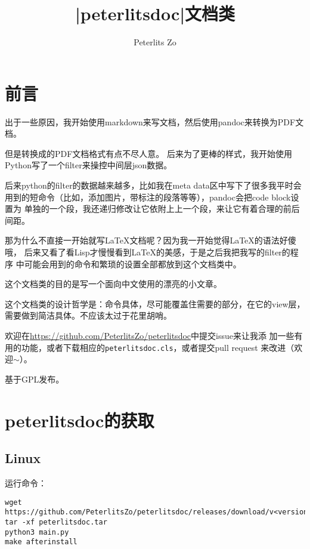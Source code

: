 \documentclass{peterlitsdoc}
\title{\vb|peterlitsdoc|文档类}
\author{Peterlits Zo}
\newcommand{\vb}{\verb}
\begin{document}
\maketitle
\tableofcontents
\newpage


\section{前言}

出于一些原因，我开始使用markdown来写文档，然后使用pandoc来转换为PDF文档。

但是转换成的PDF文档格式有点不尽人意。
后来为了更棒的样式，我开始使用Python写了一个filter来操控中间层json数据。

后来python的filter的数据越来越多，比如我在meta data区中写下了很多我平时会
用到的短命令（比如，添加图片，带标注的段落等等），pandoc会把code block设置为
单独的一个段，我还递归修改让它依附上上一个段，来让它有着合理的前后间距。

那为什么不直接一开始就写\LaTeX{}文档呢？因为我一开始觉得\LaTeX{}的语法好傻哦，
后来又看了看Lisp才慢慢看到\LaTeX{}的美感，于是之后我把我写的filter的程序
中可能会用到的命令和繁琐的设置全部都放到这个文档类中。

这个文档类的目的是写一个面向中文使用的漂亮的小文章。

这个文档类的设计哲学是：命令具体，尽可能覆盖住需要的部分，在它的view层，
需要做到简洁具体。不应该太过于花里胡哨。

欢迎在\url{https://github.com/PeterlitsZo/peterlitsdoc}中提交issue来让我添
加一些有用的功能，或者下载相应的\vb|peterlitsdoc.cls|，或者提交pull request
来改进（欢迎$\sim$）。

基于GPL发布。


\section{peterlitsdoc的获取}

\subsection{Linux}

运行命令：
\begin{lstlisting}
wget https://github.com/PeterlitsZo/peterlitsdoc/releases/download/v<version>/peterlitsdoc.tar
tar -xf peterlitsdoc.tar
python3 main.py
make afterinstall
\end{lstlisting}
\end{document}
